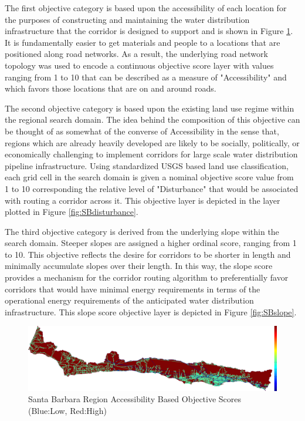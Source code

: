 The first objective category is based upon the accessibility of each location for the purposes of constructing and maintaining the water distribution infrastructure that the corridor is designed to support and is shown in Figure \ref{fig:SBaccessibility}. It is fundamentally easier to get materials and people to a locations that are positioned along road networks. As a result, the underlying road network topology was used to encode a continuous objective score layer with values ranging from 1 to 10 that can be described as a measure of "Accessibility" and which favors those locations that are on and around roads.

The second objective category is based upon the existing land use regime within the regional search domain. The idea behind the composition of this objective can be thought of as somewhat of the converse of Accessibility in the sense that, regions which are already heavily developed are likely to be socially, politically, or economically challenging to implement corridors for large scale water distribution pipeline infrastructure. Using standardized USGS based land use classification, each grid cell in the search domain is given a nominal objective score value from 1 to 10  corresponding the relative level of "Disturbance" that would be associated with routing a corridor across it. This objective layer is depicted in the layer plotted in Figure \ref{fig:SBdisturbance}.

The third objective category is derived from the underlying slope within the search domain. Steeper slopes are assigned a higher ordinal score, ranging from 1 to 10. This objective reflects the desire for corridors to be shorter in length and minimally accumulate slopes over their length. In this way, the slope score provides a mechanism for the corridor routing algorithm to preferentially favor corridors that would have minimal energy requirements in terms of the operational energy requirements of the anticipated water distribution infrastructure. This slope score objective layer is depicted in Figure \ref{fig:SBslope}. 

        \begin{figure}[!h]
            \begin{center}
            \includegraphics[width=5.5in]{figures/SantaBarbara_AccessibilityScore.png}   
            \caption{Santa Barbara Region Accessibility Based Objective Scores (Blue:Low, Red:High)}
            \label{fig:SBaccessibility}
            \end{center}
        \end{figure} 

